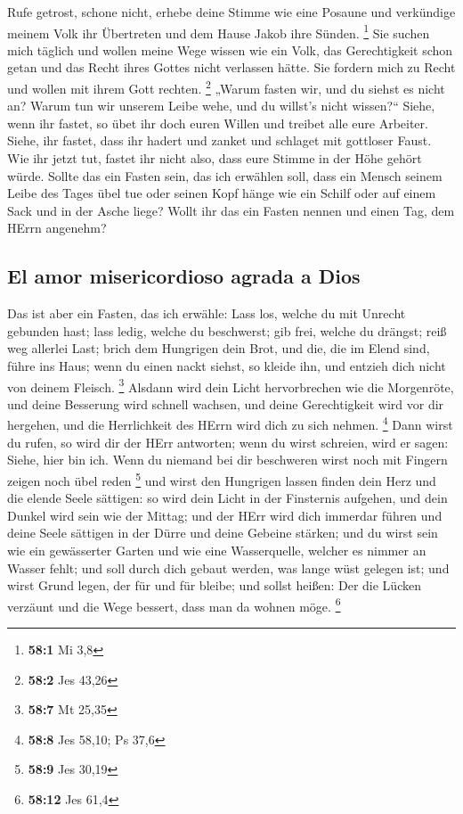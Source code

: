  Rufe getrost, schone nicht, erhebe deine Stimme wie eine
Posaune und verkündige meinem Volk ihr Übertreten und dem Hause Jakob
ihre Sünden. \footnote{\textbf{58:1} Mi 3,8}  Sie suchen
mich täglich und wollen meine Wege wissen wie ein Volk, das
Gerechtigkeit schon getan und das Recht ihres Gottes nicht verlassen
hätte. Sie fordern mich zu Recht und wollen mit ihrem Gott rechten.
\footnote{\textbf{58:2} Jes 43,26}  „Warum fasten wir, und
du siehst es nicht an? Warum tun wir unserem Leibe wehe, und du willst's
nicht wissen?{}`` Siehe, wenn ihr fastet, so übet ihr doch euren Willen
und treibet alle eure Arbeiter.  Siehe, ihr fastet, dass
ihr hadert und zanket und schlaget mit gottloser Faust. Wie ihr jetzt
tut, fastet ihr nicht also, dass eure Stimme in der Höhe gehört würde.
 Sollte das ein Fasten sein, das ich erwählen soll, dass
ein Mensch seinem Leibe des Tages übel tue oder seinen Kopf hänge wie
ein Schilf oder auf einem Sack und in der Asche liege? Wollt ihr das ein
Fasten nennen und einen Tag, dem HErrn angenehm?

\hypertarget{el-amor-misericordioso-agrada-a-dios}{%
\subsection{El amor misericordioso agrada a
Dios}\label{el-amor-misericordioso-agrada-a-dios}}

 Das ist aber ein Fasten, das ich erwähle: Lass los,
welche du mit Unrecht gebunden hast; lass ledig, welche du beschwerst;
gib frei, welche du drängst; reiß weg allerlei Last; 
brich dem Hungrigen dein Brot, und die, die im Elend sind, führe ins
Haus; wenn du einen nackt siehst, so kleide ihn, und entzieh dich nicht
von deinem Fleisch. \footnote{\textbf{58:7} Mt 25,35} 
Alsdann wird dein Licht hervorbrechen wie die Morgenröte, und deine
Besserung wird schnell wachsen, und deine Gerechtigkeit wird vor dir
hergehen, und die Herrlichkeit des HErrn wird dich zu sich nehmen.
\footnote{\textbf{58:8} Jes 58,10; Ps 37,6}  Dann wirst du
rufen, so wird dir der HErr antworten; wenn du wirst schreien, wird er
sagen: Siehe, hier bin ich. Wenn du niemand bei dir beschweren wirst
noch mit Fingern zeigen noch übel reden \footnote{\textbf{58:9} Jes
  30,19}  und wirst den Hungrigen lassen finden dein Herz
und die elende Seele sättigen: so wird dein Licht in der Finsternis
aufgehen, und dein Dunkel wird sein wie der Mittag;  und
der HErr wird dich immerdar führen und deine Seele sättigen in der Dürre
und deine Gebeine stärken; und du wirst sein wie ein gewässerter Garten
und wie eine Wasserquelle, welcher es nimmer an Wasser fehlt;
 und soll durch dich gebaut werden, was lange wüst
gelegen ist; und wirst Grund legen, der für und für bleibe; und sollst
heißen: Der die Lücken verzäunt und die Wege bessert, dass man da wohnen
möge. \footnote{\textbf{58:12} Jes 61,4}


